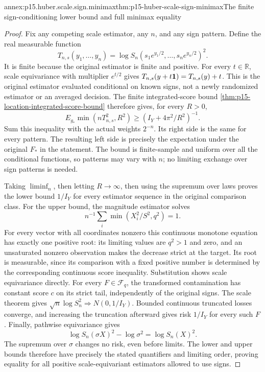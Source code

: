 \begin{annexitem}{annex:p15.huber.scale.sign.minimax}{thm:p15-huber-scale-sign-minimax}{The finite sign-conditioning lower bound and full minimax equality}
\begin{proof}
Fix any competing scale estimator, any \(n\), and any sign pattern.
Define the real measurable function
\[
 T_{n,s}(y_1,\ldots,y_n)
       =\log S_n(s_1e^{y_1/2},\ldots,s_ne^{y_n/2})^2 .
\]
It is finite because the original estimator is finite and positive.
For every \(t\in\mathbb R\), scale equivariance with multiplier
\(e^{t/2}\) gives
\(T_{n,s}(y+t{\bf1})=T_{n,s}(y)+t\).
This is the original estimator evaluated conditional on known signs,
not a newly randomized estimator or an averaged decision.
The finite integrated-score bound
\cref{thm:p15-location-integrated-score-bound} therefore gives,
for every \(R>0\),
\[
 E_{g_*}\min(nT_{n,s}^2,R^2)
                     \geq (I_Y+4\pi^2/R^2)^{-1}.
\]
Sum this inequality with the actual weights \(2^{-n}\).
Its right side is the same for every pattern. The resulting
left side is precisely the expectation under the original \(F_*\)
in the statement. The bound is finite-sample and uniform over
all the conditional functions, so patterns may vary with \(n\);
no limiting exchange over sign patterns is needed.

Taking \(\liminf_n\), then letting \(R\to\infty\), then using
the supremum over laws proves the lower bound \(1/I_Y\) for
every estimator sequence in the original comparison class.
For the upper bound, the magnitude estimator solves
\[
                    n^{-1}\sum_i\min(X_i^2/S^2,q^2)=1.
\]
For every vector with all coordinates nonzero this continuous monotone
equation has exactly one positive root: its limiting values
are \(q^2>1\) and zero, and an unsaturated nonzero observation
makes the decrease strict at the target. Its root is measurable,
since its comparison with a fixed positive number is determined
by the corresponding continuous score inequality. Substitution
shows scale equivariance directly.
For every \(F\in\mathcal F_q\), the transformed contamination
has constant score \(c\) on its strict tail, independently of
the original signs. The scale theorem gives
\(\sqrt n\log S_n^2\Rightarrow N(0,1/I_Y)\).
Bounded continuous truncated losses converge, and increasing
the truncation afterward gives risk \(1/I_Y\) for every such \(F\).
Finally, pathwise equivariance gives
\[
 \log S_n(\sigma X)^2-\log\sigma^2=\log S_n(X)^2.
\]
The supremum over \(\sigma\) changes no risk, even before limits.
The lower and upper bounds therefore have precisely the stated
quantifiers and limiting order, proving equality for all positive
scale-equivariant estimators allowed to use signs.
\end{proof}
\end{annexitem}
